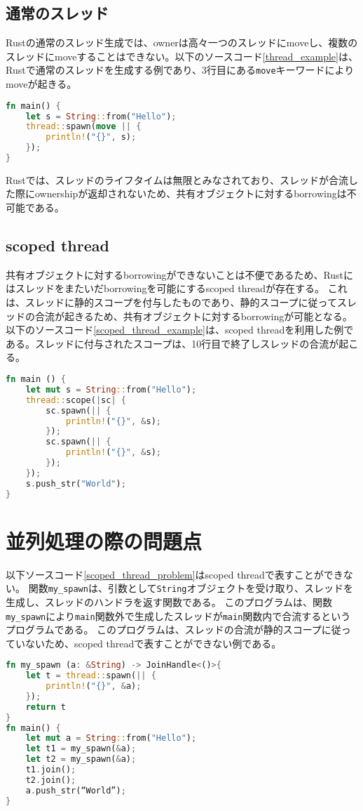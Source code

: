 \documentclass{sumiilab-paper}
\theoremstyle{mystyle}
\numberwithin{definition}{chapter} %
\begin{document}
\subsection{通常のスレッド}
Rustの通常のスレッド生成では、ownerは高々一つのスレッドにmoveし、複数のスレッドにmoveすることはできない。以下のソースコード\ref{thread_example}は、Rustで通常のスレッドを生成する例であり、3行目にある\texttt{move}キーワードによりmoveが起きる。
\begin{lstlisting}[language=Rust, caption=Rustでの通常のスレッド生成の例, label=thread_example, captionpos=b]
fn main() {
    let s = String::from("Hello");
    thread::spawn(move || {
        println!("{}", s);
    });
}
\end{lstlisting}

Rustでは、スレッドのライフタイムは無限とみなされており、スレッドが合流した際にownershipが返却されないため、共有オブジェクトに対するborrowingは不可能である。

\subsection{scoped thread}
共有オブジェクトに対するborrowingができないことは不便であるため、Rustにはスレッドをまたいだborrowingを可能にするscoped threadが存在する。
これは、スレッドに静的スコープを付与したものであり、静的スコープに従ってスレッドの合流が起きるため、共有オブジェクトに対するborrowingが可能となる。
以下のソースコード\ref{scoped_thread_example}は、scoped threadを利用した例である。スレッドに付与されたスコープは、10行目で終了しスレッドの合流が起こる。
\begin{lstlisting}[language=Rust, caption=scoped threadの例, label=scoped_thread_example, captionpos=b]
fn main () {
    let mut s = String::from("Hello");
    thread::scope(|sc| {
        sc.spawn(|| {
            println!("{}", &s);
        });
        sc.spawn(|| {
            println!("{}", &s);
        });
    });
    s.push_str("World");
}
\end{lstlisting}

\section{並列処理の際の問題点}
以下ソースコード\ref{scoped_thread_problem}はscoped threadで表すことができない。
関数\texttt{my\_spawn}は、引数として\texttt{String}オブジェクトを受け取り、スレッドを生成し、スレッドのハンドラを返す関数である。
このプログラムは、関数\texttt{my\_spawn}により\texttt{main}関数外で生成したスレッドが\texttt{main}関数内で合流するというプログラムである。
このプログラムは、スレッドの合流が静的スコープに従っていないため、scoped threadで表すことができない例である。
\begin{lstlisting}[language=Rust, caption=scoped threadで表せない例, label=scoped_thread_problem, captionpos=b]
fn my_spawn (a: &String) -> JoinHandle<()>{
    let t = thread::spawn(|| {
        println!("{}", &a);
    });
    return t
}
fn main() {
    let mut a = String::from("Hello");
    let t1 = my_spawn(&a);
    let t2 = my_spawn(&a);
    t1.join();
    t2.join();
    a.push_str(“World”);
}
\end{lstlisting}
\end{document}
